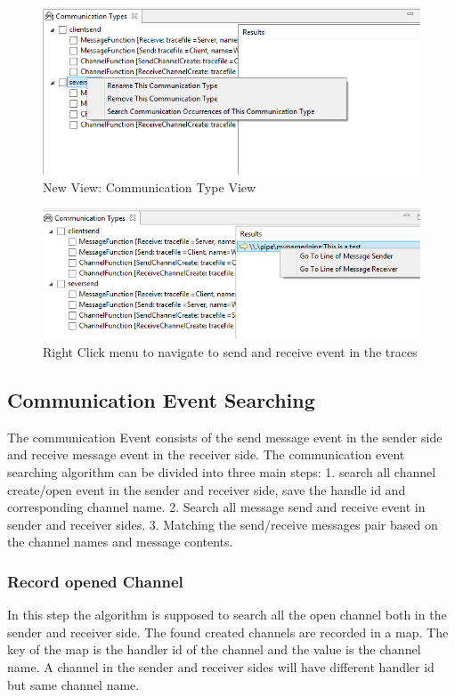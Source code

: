 \documentclass[paper=a4, fontsize=11pt]{scrartcl}
\numberwithin{equation}{section}		%
\numberwithin{figure}{section}			%
\numberwithin{table}{section}				%
\begin{document}
\begin{figure}[h]
\includegraphics{CommunicationTypeview}
 \caption{New View: Communication Type View}
\label{CommunicationTypeview}
\end{figure}

\begin{figure}[h]
\includegraphics{searchresult}
 \caption{Right Click menu to navigate to send and receive event in the traces}
\label{searchresult}
\end{figure}

\subsection{Communication Event Searching}
The communication Event consists of the send message event in the sender side and receive message event in the receiver side. The communication event searching algorithm can be divided into three main steps: 1. search all channel create/open event in the sender and receiver side, save the handle id and corresponding channel name. 2. Search all message send and receive event in sender and receiver sides. 3. Matching the send/receive messages pair based on the channel names and message contents.
\subsubsection{Record opened Channel}
In this step the algorithm is supposed to search all the open channel both in the sender and receiver side. The found created channels are recorded in a map. The key of the map is the handler id of the channel and the value is the channel name. A channel in the sender and receiver sides will have different handler id but same channel name.
\end{document}
